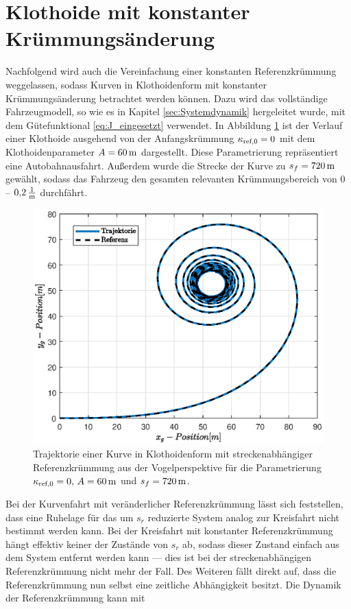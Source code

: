 \section{Klothoide mit konstanter Krümmungsänderung}\label{sec:Klothoide}
Nachfolgend wird auch die Vereinfachung einer konstanten Referenzkrümmung weggelassen, sodass Kurven in Klothoidenform mit konstanter Krümmungsänderung betrachtet werden können. Dazu wird das vollständige Fahrzeugmodell, so wie es in Kapitel \ref{sec:Systemdynamik} hergeleitet wurde, mit dem Gütefunktional \eqref{eq:J_eingesetzt} verwendet. In Abbildung \ref{fig:xy_pos_klothoide} ist der Verlauf einer Klothoide ausgehend von der Anfangskrümmung $\kappa_{\textrm{ref},0} = 0$ mit dem Klothoidenparameter $A = 60\,\mathrm{m}$ dargestellt. Diese Parametrierung repräsentiert eine Autobahnausfahrt. Außerdem wurde die Strecke der Kurve zu $s_f = 720\,\mathrm{m}$ gewählt, sodass das Fahrzeug den gesamten relevanten Krümmungsbereich von $0$ -- $0{,}2\,\mathrm{\frac{\mathrm{1}}{\mathrm{m}}}$ durchfährt. 
\begin{figure}[h] 
	\centering
	\includegraphics[width=0.7\linewidth]{./Bilder/Ergebnisse/Klothoide/xy_pos.eps}
	\caption{Trajektorie einer Kurve in Klothoidenform mit streckenabhängiger Referenzkrümmung aus der Vogelperspektive für die Parametrierung $\kappa_{\textrm{ref},0} = 0,\, A = 60\,\mathrm{m}$ und $s_f = 720\,\mathrm{m}$.}
	\label{fig:xy_pos_klothoide}
\end{figure} 
Bei der Kurvenfahrt mit veränderlicher Referenzkrümmung lässt sich feststellen, dass eine Ruhelage für das um $s_r$ reduzierte System analog zur Kreisfahrt nicht bestimmt werden kann. Bei der Kreisfahrt mit konstanter Referenzkrümmung hängt effektiv keiner der Zustände von $s_r$ ab, sodass dieser Zustand einfach aus dem System entfernt werden kann --- dies ist bei der streckenabhängigen Referenzkrümmung nicht mehr der Fall. Des Weiteren fällt direkt auf, dass die Referenzkrümmung nun selbst eine zeitliche Abhängigkeit besitzt. Die Dynamik der Referenzkrümmung kann mit 
